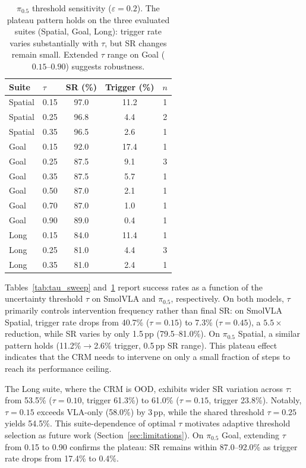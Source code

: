 \begin{table}[h]
\centering
\caption{$\pi_{0.5}$ threshold sensitivity ($\varepsilon{=}0.2$). The plateau pattern holds on the three evaluated suites (Spatial, Goal, Long): trigger rate varies substantially with $\tau$, but SR changes remain small. Extended $\tau$ range on Goal ($0.15$--$0.90$) suggests robustness.}
\label{tab:tau_sweep_pi05}
\small
\begin{tabular}{llccc}
\toprule
Suite & $\tau$ & SR (\%) & Trigger (\%) & $n$ \\
\midrule
Spatial & 0.15 & 97.0 & 11.2 & 1 \\
Spatial & 0.25 & 96.8 & 4.4 & 2 \\
Spatial & 0.35 & 96.5 & 2.6 & 1 \\
\midrule
Goal & 0.15 & 92.0 & 17.4 & 1 \\
Goal & 0.25 & 87.5 & 9.1 & 3 \\
Goal & 0.35 & 87.5 & 5.7 & 1 \\
Goal & 0.50 & 87.0 & 2.1 & 1 \\
Goal & 0.70 & 87.0 & 1.0 & 1 \\
Goal & 0.90 & 89.0 & 0.4 & 1 \\
\midrule
Long & 0.15 & 84.0 & 11.4 & 1 \\
Long & 0.25 & 81.0 & 4.4 & 3 \\
Long & 0.35 & 81.0 & 2.4 & 1 \\
\bottomrule
\end{tabular}
\end{table}

 Tables~\ref{tab:tau_sweep} and~\ref{tab:tau_sweep_pi05} report success rates as a function of the uncertainty threshold $\tau$ on SmolVLA and $\pi_{0.5}$, respectively. On both models, $\tau$ primarily controls intervention frequency rather than final SR: on SmolVLA Spatial, trigger rate drops from 40.7\% ($\tau{=}0.15$) to 7.3\% ($\tau{=}0.45$), a $5.5{\times}$ reduction, while SR varies by only 1.5\,pp (79.5--81.0\%). On $\pi_{0.5}$ Spatial, a similar pattern holds (11.2\%$\to$2.6\% trigger, 0.5\,pp SR range). This plateau effect indicates that the CRM needs to intervene on only a small fraction of steps to reach its performance ceiling.

 The Long suite, where the CRM is OOD, exhibits wider SR variation across $\tau$: from 53.5\% ($\tau{=}0.10$, trigger 61.3\%) to 61.0\% ($\tau{=}0.15$, trigger 23.8\%). Notably, $\tau{=}0.15$ exceeds VLA-only (58.0\%) by 3\,pp, while the shared threshold $\tau{=}0.25$ yields 54.5\%. This suite-dependence of optimal $\tau$ motivates adaptive threshold selection as future work (Section~\ref{sec:limitations}). On $\pi_{0.5}$ Goal, extending $\tau$ from 0.15 to 0.90 confirms the plateau: SR remains within 87.0--92.0\% as trigger rate drops from 17.4\% to 0.4\%.

